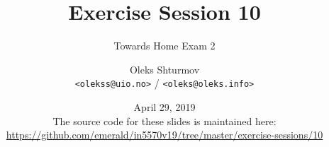 \documentclass[xcolor=table]{beamer}
\title{{\Large Exercise Session 10}}
\subtitle{Towards Home Exam 2}
\institute{{\large University of Oslo}\\[0.2em] IN[59]570: Distributed Objects}
\author{Oleks Shturmov\\[-0.2em]%
  {\tiny \texttt{<olekss@uio.no>} / \texttt{<oleks@oleks.info>}}
}
\date{April 29, 2019\\[2em]
{\scriptsize The source code for these slides is maintained here: \\[-0.5em] {\tiny%
\url{https://github.com/emerald/in5570v19/tree/master/exercise-sessions/10}}%
}}
\begin{document}
\begin{frame} \titlepage \end{frame}








\end{document}
